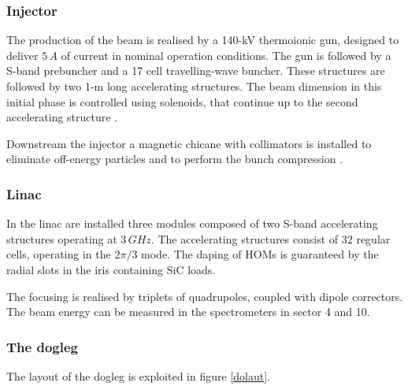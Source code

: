 \subsubsection{Injector}

The production of the beam is realised by a 140-kV thermoionic gun, designed to deliver $5\,A$ of current in nominal operation conditions.
The gun is followed by a S-band prebuncher and a 17 cell travelling-wave buncher. These structures are followed by two 1-m long accelerating structures. The beam dimension in this initial phase is controlled using solenoids, that continue up to the second accelerating structure \cite{ctf:injector}.

Downstream the injector a magnetic chicane with collimators is installed to eliminate off-energy particles and to perform the bunch compression  \cite{Braun:999488}.

\subsubsection{Linac}

In the linac are installed three modules composed of two S-band accelerating structures operating at $3\,GHz$. The accelerating structures consist of 32 regular cells, operating in the $2\pi/3$ mode. The daping of HOMs is guaranteed by the radial slots in the iris containing SiC loads.

The focusing is realised by triplets of quadrupoles, coupled with dipole correctors. The beam energy can be measured in the spectrometers in sector 4 and 10.



\subsubsection{The dogleg}

 The layout of the dogleg is exploited in figure \ref{dolaut}.




